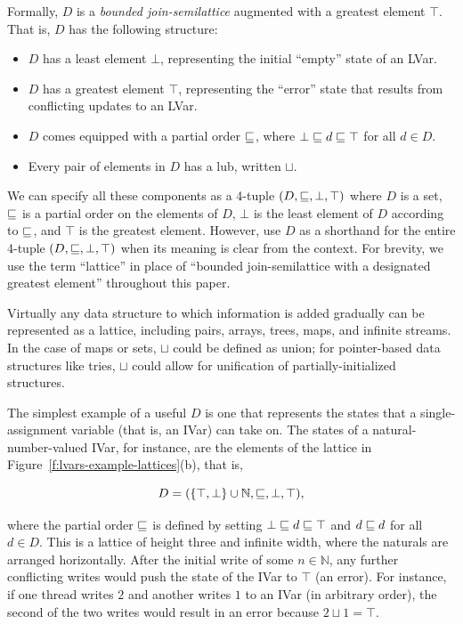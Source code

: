 Formally, $D$ is a \emph{bounded join-semilattice} augmented with a
greatest element $\top$.  That is, $D$ has the following structure:
\begin{itemize}
\item $D$ has a least element $\bot$, representing the initial
  ``empty'' state of an LVar.
\item $D$ has a greatest element $\top$, representing the ``error''
  state that results from conflicting updates to an LVar.
\item $D$ comes equipped with a partial order $\sqsubseteq$, where $\bot
  \sqsubseteq d \sqsubseteq \top$ for all $d \in D$.
\item Every pair of elements in $D$ has a lub, written $\sqcup$.
\end{itemize}
We can specify all these components as a 4-tuple $(D, \sqsubseteq, \bot,
\top)$ where $D$ is a set, $\sqsubseteq$ is a partial order on the
elements of $D$, $\bot$ is the least element of $D$ according to
$\sqsubseteq$, and $\top$ is the greatest element.  However,  use $D$ as a
shorthand for the entire 4-tuple $(D, \sqsubseteq, \bot, \top)$ when its
meaning is clear from the context.
\ifdefined\JOURNAL
For brevity, we use the term ``lattice'' in place of ``bounded
join-semilattice with a designated greatest element'' throughout this
paper.
\fi

Virtually any data structure to which information is added gradually
can be represented as a lattice, including pairs, arrays, trees, maps,
and infinite streams.  In the case of maps or sets, $\sqcup$ could be
defined as union; for pointer-based data structures like tries, $\sqcup$
could allow for unification of partially-initialized structures.

The simplest example of a useful $D$ is one that represents the
states that a single-assignment variable (that is, an IVar) can take
on.  The states of a natural-number-valued IVar, for instance, are the elements of
the lattice in
Figure~\ref{f:lvars-example-lattices}(b), that is,

\vspace{-8mm}
\singlespacing
\begin{displaymath}
  D = (\lbrace \top, \bot \rbrace \cup \mathbb{N}, \sqsubseteq, \bot, \top), 
\end{displaymath}
\doublespacing

where the partial order $\sqsubseteq$ is defined by setting $\bot
\sqsubseteq d \sqsubseteq \top$ and $d \sqsubseteq d$ for all $d \in D$.  This
is a lattice of height three and infinite width, where the naturals
are arranged horizontally.  After the initial write of some $n \in
\mathbb{N}$, any further conflicting writes would push the state of
the IVar to $\top$ (an error).  For instance, if one thread writes $2$
and another writes $1$ to an IVar (in arbitrary order), the second of
the two writes would result in an error because $2 \sqcup 1 = \top$.

